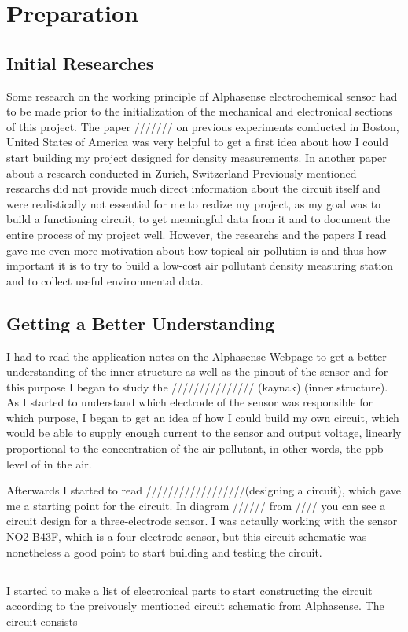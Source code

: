 \chapter{Preparation}
\label{sec:firststeps}

\section{Initial Researches}
Some research on the working principle of Alphasense  electrochemical sensor had to be made prior to the initialization of the mechanical and electronical sections of this project. The paper /////// on previous experiments conducted in Boston, United States of America was very helpful to get a first idea about how I could start building my project designed for  density measurements. In another paper about a research conducted in Zurich, Switzerland    Previously mentioned researchs did not provide much direct information about the circuit itself and were realistically not essential for me to realize my project, as my goal was to build a functioning circuit, to get meaningful data from it and to document the entire process of my project well. However, the researchs and the papers I read gave me even more motivation about how topical air pollution is and thus how important it is to try to build a low-cost air pollutant density measuring station and to collect useful environmental data.

\section{Getting a Better Understanding}
I had to read the application notes on the Alphasense Webpage to get a better understanding of the inner structure as well as the pinout of the sensor and for this purpose I began to study the /////////////// (kaynak) (inner structure). As I started to understand which electrode of the sensor was responsible for which purpose, I began to get an idea of how I could build my own circuit, which would be able to supply enough current to the sensor and output voltage, linearly proportional to the concentration of the air pollutant, in other words, the ppb level of  in the air. \par
Afterwards I started to read //////////////////(designing a circuit), which gave me a starting point for the circuit. In diagram ////// from //// you can see a circuit design for a three-electrode sensor. I was actaully working with the sensor NO2-B43F, which is a four-electrode sensor, but this circuit schematic was nonetheless a good point to start building and testing the circuit.

\section{}
I started to make a list of electronical parts to start constructing the circuit according to the preivously mentioned circuit schematic from Alphasense. The circuit consists 


